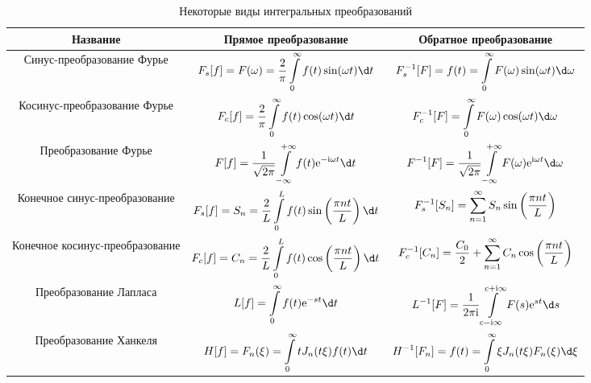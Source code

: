 \begin{table}[h!]
    \center
    \caption{Некоторые виды интегральных преобразований}
    \begin{tabular}{|C{.17}|C{.4}|C{.4}|} \hline
        Название & Прямое преобразование & Обратное преобразование \\ \hline
        Синус-преобразование Фурье &
        \( \ds
            F_s[f] = F(\omega) = \frac{2}{\pi}\int\limits_0^\infty f(t)
            \sin(\omega t)\d t
        \)
        &
        \( \ds
            F_s^{-1}[F] = f(t) = \int\limits_0^\infty F(\omega)\sin(\omega t)
            \d\omega
        \) \\ \hline
        Косинус-преобразование Фурье &
        \( \ds
            F_c[f] = \frac{2}{\pi}\int\limits_0^\infty f(t)\cos(\omega t)\d t
        \)
        &
        \( \ds
            F_c^{-1}[F] = \int\limits_0^\infty F(\omega)\cos(\omega t)\d\omega
        \) \\ \hline
        Преобразование Фурье &
        \( \ds
            F[f] = \frac{1}{\sqrt{2\pi}}\int\limits_{-\infty}^{+\infty} f(t)
            \e^{-\im\omega t}\d t
        \)
        &
        \( \ds
            F^{-1}[F] = \frac{1}{\sqrt{2\pi}}\int\limits_{-\infty}^{+\infty}
            F(\omega)\e^{\im\omega t}\d\omega
        \) \\ \hline
        Конечное синус-преобразование &
        \( \ds
            F_s[f] = S_n = \frac{2}{L}\int\limits_0^L f(t)\sin\left(
            \frac{\pi nt}{L}\right)\d t
        \)
        &
        \( \displaystyle
            F_s^{-1}[S_n] = \sum\limits_{n=1}^\infty S_n\sin\left(
            \frac{\pi nt}{L}\right)
        \) \\ \hline
        Конечное косинус-преобразование &
        \( \ds
            F_c[f] = C_n = \frac{2}{L}\int\limits_0^L f(t)\cos\left(
            \frac{\pi nt}{L}\right)\d t
        \)
        &
        \( \displaystyle
            F_c^{-1}[C_n] = \frac{C_0}{2} + \sum\limits_{n=1}^\infty
            C_n\cos\left(\frac{\pi nt}{L}\right)
        \) \\ \hline
        Преобразование Лапласа &
        \( \ds
            L[f] = \int\limits_0^\infty f(t)\e^{-st}\d t
        \)
        &
        \( \ds
            L^{-1}[F] = \frac{1}{2\pi\im}\int\limits_{c-\im\infty}^{c+\im\infty}
            F(s)\e^{st}\d s
        \) \\ \hline
        Преобразование Ханкеля &
        \( \ds
            H[f] = F_n(\xi) = \int\limits_0^\infty tJ_n(t\xi)f(t)\d t
        \)
        &
        \( \ds
            H^{-1}[F_n] = f(t) = \int\limits_0^\infty \xi J_n(t\xi)F_n(\xi)\d\xi
        \) \\ \hline
    \end{tabular}
\end{table}

